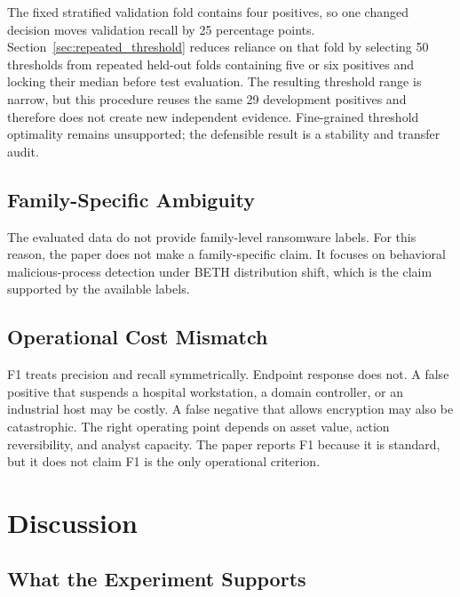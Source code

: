 \documentclass[10pt,journal,compsoc]{IEEEtran}
\begin{document}
The fixed stratified validation fold contains four positives, so one changed decision moves validation recall by 25 percentage points. Section~\ref{sec:repeated_threshold} reduces reliance on that fold by selecting 50 thresholds from repeated held-out folds containing five or six positives and locking their median before test evaluation. The resulting threshold range is narrow, but this procedure reuses the same 29 development positives and therefore does not create new independent evidence. Fine-grained threshold optimality remains unsupported; the defensible result is a stability and transfer audit.

\subsection{Family-Specific Ambiguity}

The evaluated data do not provide family-level ransomware labels. For this reason, the paper does not make a family-specific claim. It focuses on behavioral malicious-process detection under BETH distribution shift, which is the claim supported by the available labels.

\subsection{Operational Cost Mismatch}

F1 treats precision and recall symmetrically. Endpoint response does not. A false positive that suspends a hospital workstation, a domain controller, or an industrial host may be costly. A false negative that allows encryption may also be catastrophic. The right operating point depends on asset value, action reversibility, and analyst capacity. The paper reports F1 because it is standard, but it does not claim F1 is the only operational criterion.

\section{Discussion}
\label{sec:discussion}

\subsection{What the Experiment Supports}
\end{document}
